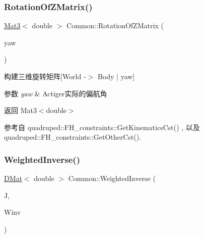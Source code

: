 \subsubsection{\texorpdfstring{Rotation\+Of\+Z\+Matrix()}{RotationOfZMatrix()}}
{\footnotesize\ttfamily \hyperlink{cppTypes_8h_adb7d462b35d31f0b2583b3e230a2a2c3}{Mat3}$<$ double $>$ Common\+::\+Rotation\+Of\+Z\+Matrix (\begin{DoxyParamCaption}\item[{double}]{yaw }\end{DoxyParamCaption})\hspace{0.3cm}{\ttfamily [static]}}



构建三维旋转矩阵\mbox{[}World -\/$>$ Body $\vert$ yaw\mbox{]} 


\begin{DoxyParams}{参数}
{\em yaw} & Actiger实际的偏航角 \\
\hline
\end{DoxyParams}
\begin{DoxyReturn}{返回}
Mat3$<$double$>$ 
\end{DoxyReturn}


参考自 quadruped\+::\+F\+H\+\_\+constraints\+::\+Get\+Kinematics\+Cst() , 以及 quadruped\+::\+F\+H\+\_\+constraints\+::\+Get\+Other\+Cst().

\mbox{\label{classquadruped_1_1Common_a0b5411a1c977d54a3f2cf88ab7662c1c}} 
\subsubsection{\texorpdfstring{Weighted\+Inverse()}{WeightedInverse()}}
{\footnotesize\ttfamily \hyperlink{cppTypes_8h_a5db6bfb25afa103db1fb6bb6287ae9d7}{D\+Mat}$<$ double $>$ Common\+::\+Weighted\+Inverse (\begin{DoxyParamCaption}\item[{\hyperlink{cppTypes_8h_a5db6bfb25afa103db1fb6bb6287ae9d7}{D\+Mat}$<$ double $>$}]{J,  }\item[{\hyperlink{cppTypes_8h_a5db6bfb25afa103db1fb6bb6287ae9d7}{D\+Mat}$<$ double $>$}]{Winv }\end{DoxyParamCaption})\hspace{0.3cm}{\ttfamily [static]}}


